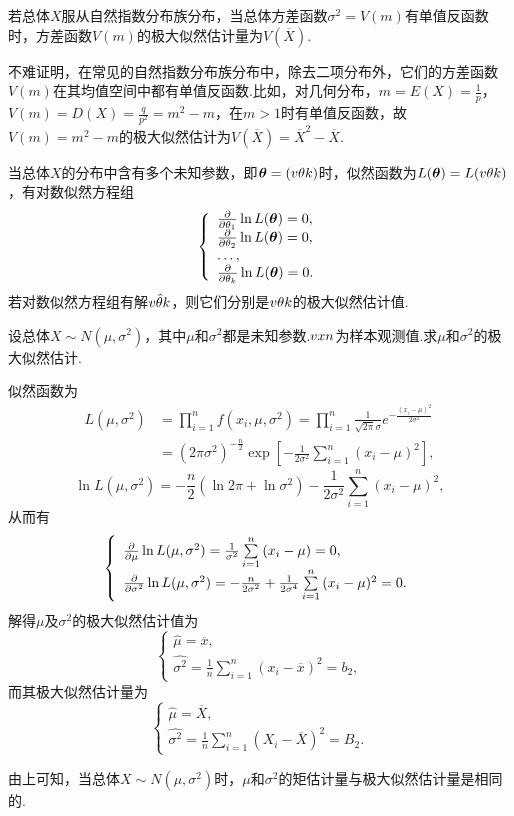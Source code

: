 \begin{corollary}
若总体\(X\)服从自然指数分布族分布，当总体方差函数\(\sigma^2=V(m)\)有单值反函数时，方差函数\(V(m)\)的极大似然估计量为\(V(\overline{X})\).
\end{corollary}
不难证明，在常见的自然指数分布族分布中，除去二项分布外，它们的方差函数\(V(m)\)在其均值空间中都有单值反函数.比如，对几何分布，\(m=E(X)=\frac{1}{p}\)，\(V(m)=D(X)=\frac{q}{p^2}=m^2-m\)，在\(m>1\)时有单值反函数，故\(V(m)=m^2-m\)的极大似然估计为\(V(\overline{X})=\overline{X}^2 - \overline{X}\).

当总体\(X\)的分布中含有多个未知参数，即\(\boldsymbol{\theta}=(v{\theta}{k})\)时，似然函数为\(L(\boldsymbol{\theta})=L(v{\theta}{k})\)，有对数似然方程组\[
\def\g#1{\pdv{\theta_{#1}} \ln L(\mat{\theta}) = 0}
\left\{ \begin{array}{l}
\g{1}, \\
\g{2}, \\
\dots, \\
\g{k}. \\
\end{array} \right.
\]若对数似然方程组有解\(v{\hat{\theta}}{k}\)，则它们分别是\(v{\theta}{k}\)的极大似然估计值.

\begin{example}
设总体\(X \sim N(\mu,\sigma^2)\)，其中\(\mu\)和\(\sigma^2\)都是未知参数.\(v{x}{n}\)为样本观测值.求\(\mu\)和\(\sigma^2\)的极大似然估计.
\begin{solution}
似然函数为\begin{align*}
L(\mu,\sigma^2)
&= \prod\limits_{i=1}^n{f(x_i,\mu,\sigma^2)}
= \prod\limits_{i=1}^n{\frac{1}{\sqrt{2\pi}\sigma} e^{-\frac{(x_i-\mu)^2}{2\sigma^2}}} \\
&= (2\pi\sigma^2)^{-\frac{n}{2}} \exp[-\frac{1}{2\sigma^2} \sum\limits_{i=1}^n{(x_i-\mu)^2}],
\end{align*}\[
\ln L(\mu,\sigma^2) = -\frac{n}{2} (\ln{2\pi} + \ln \sigma^2) - \frac{1}{2\sigma^2} \sum\limits_{i=1}^n{(x_i-\mu)^2},
\]从而有\[
\left\{ \begin{array}{l}
\pdv{\mu} \ln L(\mu,\sigma^2) = \frac{1}{\sigma^2} \sum\limits_{i=1}^n{(x_i-\mu)} = 0, \\
\pdv{\sigma^2} \ln L(\mu,\sigma^2) = -\frac{n}{2\sigma^2} + \frac{1}{2\sigma^4} \sum\limits_{i=1}^n{(x_i-\mu)^2} = 0.
\end{array} \right.
\]解得\(\mu\)及\(\sigma^2\)的极大似然估计值为\[
\left\{ \begin{array}{l}
\hat{\mu} = \overline{x}, \\
\hat{\sigma^2} = \frac{1}{n} \sum\limits_{i=1}^n{(x_i-\overline{x})^2} = b_2,
\end{array} \right.
\]而其极大似然估计量为\[
\left\{ \begin{array}{l}
\hat{\mu} = \overline{X}, \\
\hat{\sigma^2} = \frac{1}{n} \sum\limits_{i=1}^n{(X_i-\overline{X})^2} = B_2.
\end{array} \right.
\]
\end{solution}
\end{example}
由上可知，当总体\(X \sim N(\mu,\sigma^2)\)时，\(\mu\)和\(\sigma^2\)的矩估计量与极大似然估计量是相同的.

